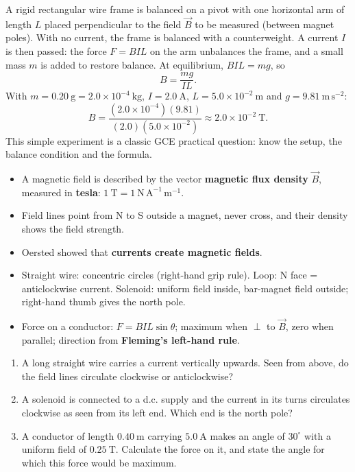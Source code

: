 \documentclass[11pt]{article}
\begin{document}
\begin{experience}
A rigid rectangular wire frame is balanced on a pivot with one horizontal arm of length $L$ placed perpendicular to the field $\vec{B}$ to be measured (between magnet poles). With no current, the frame is balanced with a counterweight. A current $I$ is then passed: the force $F = BIL$ on the arm unbalances the frame, and a small mass $m$ is added to restore balance.
At equilibrium, $BIL = mg$, so
\[
B = \frac{mg}{IL}.
\]
With $m = 0.20\ \mathrm{g} = 2.0\times 10^{-4}\ \mathrm{kg}$, $I = 2.0\ \mathrm{A}$, $L = 5.0\times 10^{-2}\ \mathrm{m}$ and $g = 9.81\ \mathrm{m\,s^{-2}}$:
\[
B = \frac{(2.0\times 10^{-4})(9.81)}{(2.0)(5.0\times 10^{-2})} \approx 2.0\times 10^{-2}\ \mathrm{T}.
\]
This simple experiment is a classic GCE practical question: know the setup, the balance condition and the formula.
\end{experience}

\begin{aretenir}
\begin{itemize}
\item A magnetic field is described by the vector \textbf{magnetic flux density} $\vec{B}$, measured in \textbf{tesla}: $1\ \mathrm{T} = 1\ \mathrm{N\,A^{-1}\,m^{-1}}$.
\item Field lines point from N to S outside a magnet, never cross, and their density shows the field strength.
\item Oersted showed that \textbf{currents create magnetic fields}.
\item Straight wire: concentric circles (right-hand grip rule). Loop: N face = anticlockwise current. Solenoid: uniform field inside, bar-magnet field outside; right-hand thumb gives the north pole.
\item Force on a conductor: $F = BIL\sin\theta$; maximum when $\perp$ to $\vec{B}$, zero when parallel; direction from \textbf{Fleming's left-hand rule}.
\end{itemize}
\end{aretenir}

\begin{exercice}
\begin{enumerate}
\item A long straight wire carries a current vertically upwards. Seen from above, do the field lines circulate clockwise or anticlockwise?
\item A solenoid is connected to a d.c. supply and the current in its turns circulates clockwise as seen from its left end. Which end is the north pole?
\item A conductor of length $0.40\ \mathrm{m}$ carrying $5.0\ \mathrm{A}$ makes an angle of $30^{\circ}$ with a uniform field of $0.25\ \mathrm{T}$. Calculate the force on it, and state the angle for which this force would be maximum.
\end{enumerate}
\end{exercice}
\end{document}
